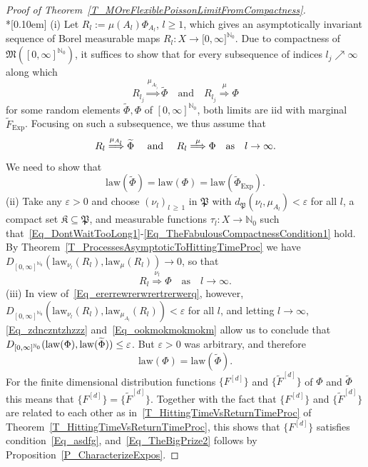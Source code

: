 \documentclass[AHL,Unicode,longabstracts]{cedram}
\newcommand{\Expl}{\mathrm{Exp}}
\newcommand{\law}{\mathrm{law}}
\newcommand{\frkK}{\mathfrak{K}}
\newcommand{\frkP}{\mathfrak{P}}
\newcommand{\frkM}{\mathfrak{M}}
\newcommand{\bbN}{\mathbb{N}}
\begin{document}
\begin{proof}[{Proof of Theorem~\ref{T_MOreFlexiblePoissonLimitFromCompactness}}]\ \\*[0.10em]
\noindent (i) Let $R_{l}:=\mu(A_{l})\Phi_{A_{l}}$, $l\geq1$, which gives an asymptotically invariant sequence of Borel measurable maps $R_{l} :X\rightarrow\lbrack0,\infty]^{\bbN_{0}}$. Due to compactness of $\frkM([0,\infty]^{\bbN_{0}})$, it suffices to show that for every subsequence of indices $l_{j}\nearrow\infty$ along which
\[
R_{l_{j} }\overset{\mu_{A_{l_{j}}}}{\Longrightarrow}\widetilde{\Phi}\quad\text{and}\quad R_{l_{j} }\overset{\mu}{\Longrightarrow}\Phi
\]
for some random elements $\widetilde {\Phi},\Phi$ of $[0,\infty]^{\bbN_{0}}$, both limits are iid with marginal $\widetilde{F}_{\Expl}$. Focusing on such a subsequence, we thus assume that
\begin{equation}\label{Eq_zdnczntzhzzz}
R_{l}\overset{\mu_{A_{l}}}{\Longrightarrow}\widetilde{\Phi}\text{ \quad and
\quad}R_{l}\overset{\mu}{\Longrightarrow}\Phi\quad\text{as}\quad l\rightarrow
\infty. 
\end{equation}
We need to show that
\begin{equation}\label{Eq_TheBigPrize2}
\law(\widetilde{\Phi})=\law(\Phi)=\law\left(\widetilde {\Phi}_{\Expl}\right). 
\end{equation}
(ii) Take any $\varepsilon>0$ and choose $(\nu_{l})_{l\,\geq\,1}$ in $\frkP$ with $d_{\frkP}(\nu_{l},\mu_{A_{l}})<\varepsilon$ for all $l$, a compact set $\frkK\subseteq\frkP$, and measurable functions $\tau_{l}:X\rightarrow\bbN_{0}$ such that~\eqref{Eq_DontWaitTooLong1}-\eqref{Eq_TheFabulousCompactnessCondition1} hold. By Theorem~\ref{T_ProcessesAsymptoticToHittingTimeProc} we have $D_{[0,\infty]^{\bbN_{0}}}(\law_{\nu_{l}}(R_{l}),\law_{\mu} (R_{l}))\rightarrow0$, so that
\begin{equation}\label{Eq_ookmokmokmokm}
R_{l}\overset{\nu_{l}}{\Longrightarrow}\Phi \quad \text{as}\quad l\rightarrow
\infty.
\end{equation}
(iii) In view of~\eqref{Eq_ererrewrerwrertrerwerq}, however, $D_{[0,\infty]^{\bbN_{0}}}(\law_{\nu_{l}}(R_{l}),\law _{\mu_{A_{l}}}(R_{l}))<\varepsilon$ for all $l$, and letting $l\rightarrow
\infty$, \eqref{Eq_zdnczntzhzzz} and~\eqref{Eq_ookmokmokmokm} allow us to conclude that $D_{[0,\infty]^{\bbN_{0}}}(\law(\Phi),\linebreak\law(\widetilde{\Phi}))\leq\varepsilon$. But $\varepsilon>0$ was arbitrary, and therefore
\begin{equation}
\law(\Phi)=\law\left(\widetilde{\Phi}\right).
\end{equation}
For the finite dimensional distribution functions $\{F^{[d]}\}$ and $\{\widetilde{F}^{[d]}\}$ of $\Phi$ and $\widetilde{\Phi}$ this means that $\{F^{[d]}\}=\{\widetilde{F}^{[d]}\}$. Together with the fact that $\{F^{[d]}\}$ and $\{\widetilde{F}^{[d]}\}$ are related to each other as in~\eqref{T_HittingTimeVsReturnTimeProc} of Theorem~\ref{T_HittingTimeVsReturnTimeProc}, this shows that $\{F^{[d]}\}$ satisfies condition~\eqref{Eq_asdfg}, and~\eqref{Eq_TheBigPrize2} follows by Proposition~\ref{P_CharacterizeExpos}.\qedhere
\end{proof}
\end{document}
